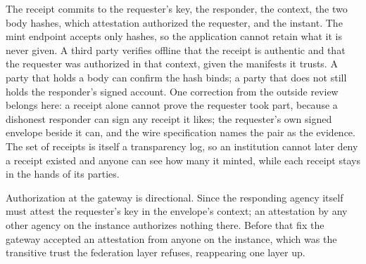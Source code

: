 
The receipt commits to the requester's key, the responder, the context, the two body hashes, which
attestation authorized the requester, and the instant. The mint endpoint accepts only hashes, so the
application cannot retain what it is never given. A third party verifies offline that the receipt is
authentic and that the requester was authorized in that context, given the manifests it trusts. A
party that holds a body can confirm the hash binds; a party that does not still holds the
responder's signed account. One correction from the outside review belongs here: a receipt alone
cannot prove the requester took part, because a dishonest responder can sign any receipt it likes;
the requester's own signed envelope beside it can, and the wire specification names the pair as the
evidence. The set of receipts is itself a transparency log, so an institution cannot later deny a
receipt existed and anyone can see how many it minted, while each receipt stays in the hands of its
parties. \sImpl

Authorization at the gateway is directional. Since  the responding agency itself must
attest the requester's key in the envelope's context; an attestation by any other agency on the
instance authorizes nothing there. Before that fix the gateway accepted an attestation from anyone
on the instance, which was the transitive trust the federation layer refuses, reappearing one layer
up. \sImpl



